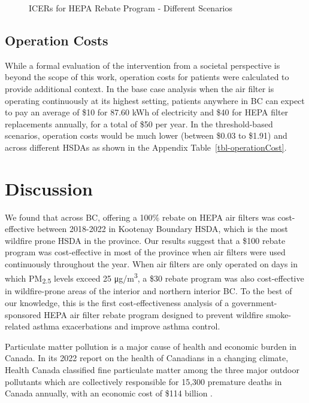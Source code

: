 \documentclass[
  number]{elsarticle}
\begin{document}
\begin{figure}
\begin{minipage}[t]{0.33\linewidth}
{{}

}

\end{minipage}%

\caption{\label{fig-scenarios}ICERs for HEPA Rebate Program - Different
Scenarios}

\end{figure}

\hypertarget{operation-costs}{%
\subsection{Operation Costs}\label{operation-costs}}

While a formal evaluation of the intervention from a societal
perspective is beyond the scope of this work, operation costs for
patients were calculated to provide additional context. In the base case
analysis when the air filter is operating continuously at its highest
setting, patients anywhere in BC can expect to pay an average of \$10
for 87.60 kWh of electricity and \$40 for HEPA filter replacements
annually, for a total of \$50 per year. In the threshold-based
scenarios, operation costs would be much lower (between \$0.03 to
\$1.91) and across different HSDAs as shown in the Appendix
Table~\ref{tbl-operationCost}.

\hypertarget{discussion}{%
\section{Discussion}\label{discussion}}

We found that across BC, offering a 100\% rebate on HEPA air filters was
cost-effective between 2018-2022 in Kootenay Boundary HSDA, which is the
most wildfire prone HSDA in the province. Our results suggest that a
\$100 rebate program was cost-effective in most of the province when air
filters were used continuously throughout the year. When air filters are
only operated on days in which PM\textsubscript{2.5} levels exceed 25
μg/m\textsuperscript{3}, a \$30 rebate program was also cost-effective
in wildfire-prone areas of the interior and northern interior BC. To the
best of our knowledge, this is the first cost-effectiveness analysis of
a government-sponsored HEPA air filter rebate program designed to
prevent wildfire smoke-related asthma exacerbations and improve asthma
control.

Particulate matter pollution is a major cause of health and economic
burden in Canada. In its 2022 report on the health of Canadians in a
changing climate, Health Canada classified fine particulate matter among
the three major outdoor pollutants which are collectively responsible
for 15,300 premature deaths in Canada annually, with an economic cost of
\$114 billion \citep{healthcanada2022}.
\end{document}
